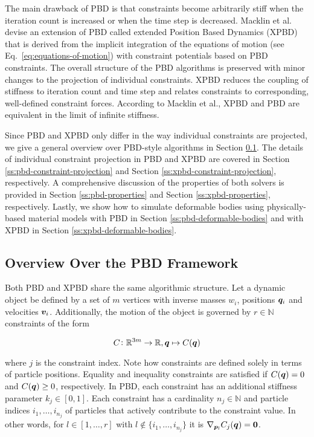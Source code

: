 The main drawback of PBD is that constraints become arbitrarily stiff when the iteration count is increased or when the time step is decreased.
Macklin et al.\ \cite{macklin2016} devise an extension of PBD called extended Position Based Dynamics (XPBD) that is derived from the implicit
integration of the equations of motion (see Eq.\ \ref{eq:equations-of-motion}) with constraint potentials based on PBD constraints. The overall structure 
of the PBD algorithms is preserved with 
minor changes to the projection of individual constraints. XPBD reduces the coupling of stiffness to iteration count and time step and relates 
constraints to corresponding, well-defined constraint forces. According to Macklin et al., XPBD and PBD are equivalent in the limit of infinite
stiffness. 

Since PBD and XPBD only differ in the way individual constraints are projected, we give a general overview over PBD-style algorithms 
in Section \ref{ss:pbd-framework}. 
The details of individual constraint projection in PBD and XPBD are covered in Section \ref{ss:pbd-constraint-projection} and 
Section \ref{ss:xpbd-constraint-projection}, respectively. A comprehensive discussion of the properties of both solvers is provided in 
Section \ref{ss:pbd-properties} and Section \ref{ss:xpbd-properties}, respectively. Lastly, we show how to simulate deformable bodies using physically-based 
material models with PBD in Section \ref{ss:pbd-deformable-bodies} and with XPBD in Section \ref{ss:xpbd-deformable-bodies}.

\subsection{Overview Over the PBD Framework}\label{ss:pbd-framework}
Both PBD and XPBD share the same algorithmic structure. Let a dynamic object be defined by a set of $m$ 
vertices with inverse masses $w_i$, positions $\bm{q}_i$ and velocities $\bm{v}_i$. Additionally, the motion of the object is governed by 
$r \in \mathbb{N}$ constraints of the form 

\[
C \colon \mathbb{R}^{3m} \to \mathbb{R}, \bm{q} \mapsto C(\bm{q})
\]

\noindent where $j$ is the constraint index. Note how constraints are defined solely in terms of particle positions. Equality and inequality constraints 
are satisfied if $C(\bm{q}) = 0$ and $C(\bm{q}) \geq 0$, respectively. In PBD, each constraint has an additional stiffness parameter $k_j \in [0,1]$. 
Each constraint has a cardinality $n_j \in \mathbb{N}$ and particle indices $i_1, \ldots, i_{n_j}$ of particles that actively contribute to the 
constraint value. In other words, for $l \in [1, \ldots, r]$ with $l \notin \{i_1, \ldots, i_{n_j}\}$ it is $\nabla_{\bm{p}_l}C_j(\bm{q}) = \bm{0}$.

